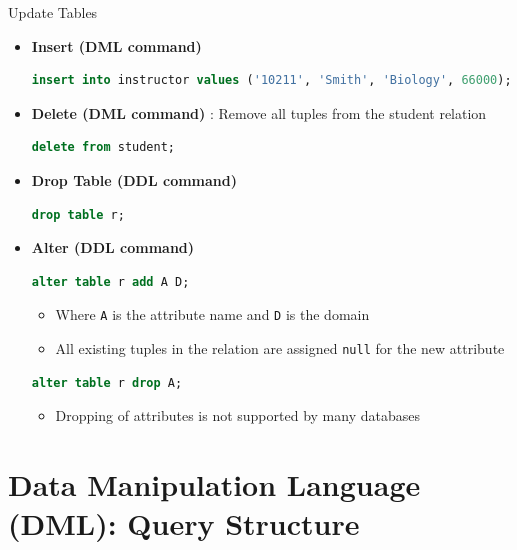 \documentclass[aspectratio=169, xcolor=dvipsnames]{beamer}
\begin{document}
\begin{frame}[fragile]{Update Tables}
    \begin{itemize}
        \item \textbf{Insert (DML command)}
        \begin{lstlisting}[language=SQL, basicstyle=\ttfamily\scriptsize]
insert into instructor values ('10211', 'Smith', 'Biology', 66000);
        \end{lstlisting}
        \item \textbf{Delete (DML command)} : Remove all tuples from the student relation
        \begin{lstlisting}[language=SQL, basicstyle=\ttfamily\scriptsize]
delete from student;
        \end{lstlisting}
        \item \textbf{Drop Table (DDL command)}
        \begin{lstlisting}[language=SQL, basicstyle=\ttfamily\scriptsize]
drop table r;
        \end{lstlisting}
        \item \textbf{Alter (DDL command)}
        \begin{lstlisting}[language=SQL, basicstyle=\ttfamily\scriptsize]
alter table r add A D;
        \end{lstlisting}
        \begin{itemize}
            \item[$\triangleright$] Where \texttt{A} is the attribute name and \texttt{D} is the domain
            \item[$\triangleright$] All existing tuples in the relation are assigned \texttt{null} for the new attribute
        \end{itemize}
        \begin{lstlisting}[language=SQL, basicstyle=\ttfamily\scriptsize]
alter table r drop A;
        \end{lstlisting}
        \begin{itemize}
            \item[$\triangleright$] Dropping of attributes is not supported by many databases
        \end{itemize}
    \end{itemize}
\end{frame}

\section{Data Manipulation Language (DML): Query Structure}
\end{document}
